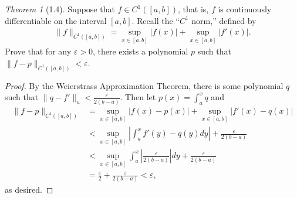 \documentclass[12pt]{article}
\theoremstyle{remark}
\theoremstyle{named}
\newtheorem*{theorem}{Theorem}
\newcommand{\e}{\varepsilon}
\newcommand{\abs}[1]{|#1|}
\newcommand{\bigabs}[1]{\left|#1\right|}
\begin{document}
\begin{theorem}[1.4]
    Suppose that \(f \in C^1([a, b])\), that is, \(f\) is continuously differentiable on the interval \([a, b]\). Recall the ``\(C^1\) norm,'' defined by 
    \begin{align*}
        \|f\|_{C^1([a, b])} = \sup_{x \in [a, b]}\abs{f(x)} + \sup_{x \in [a, b]} \abs{f'(x)}.
    \end{align*}
    Prove that for any \(\e > 0\), there exists a polynomial \(p\) such that \(\|f - p\|_{C^1([a, b])} < \e\).
\end{theorem}

\begin{proof}
    By the Weierstrass Approximation Theorem, there is some polynomial \(q\) such that \(\|q - f'\|_u < \frac{\e}{2(b - a)}\). Then let \(p(x) = \int_a^x q\) and
    \begin{align*}
        \|f - p\|_{C^1([a, b])} &= \sup_{x \in [a, b]}\abs{f(x) - p(x)} + \sup_{x \in [a, b]} \abs{f'(x) - q(x)} \\
        &< \sup_{x \in [a, b]}\bigabs{\int_{a}^{x} f'(y) - q(y) dy} + \frac{\e}{2(b - a)} \\
        &< \sup_{x \in [a, b]}\int_{a}^{x} \bigabs{\frac{\e}{2(b - a)}} dy + \frac{\e}{2(b - a)} \\
        &= \frac{\e}{2} + \frac{\e}{2(b - a)} < \e,
    \end{align*}
    as desired.
\end{proof}
\end{document}
